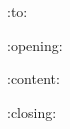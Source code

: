 \documentclass{letter}
\date{:date:}
\begin{document}
\begin{letter}{:to:}
  \opening{:opening:}
  :content:
  \closing{:closing:}
\end{letter}
\end{document}
